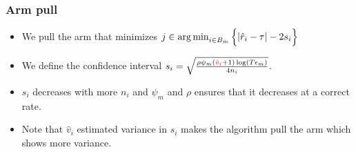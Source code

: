 \begin{frame}
\frametitle{Arm pull}
\begin{itemize}
\item<1-> We pull the arm that minimizes $j\in\operatorname*{arg\,min}_{i\in B_{m}}\Big\lbrace |\hat{r}_{i} - \tau | - 2s_{i}\Big\rbrace$
\item<2-> We define the confidence interval $s_i  = \sqrt{\frac{\rho\psi_m (\mathbin{\textcolor{red}{\hat{v}_{i}}}+1) \log ( T \epsilon_{m})}{4 n_{i}}}$.
\item<3-> $s_i$ decreases with more $n_i$ and $\psi_m$ and $\rho$ ensures that it decreases at a correct rate.
\item<4-> Note that $\hat{v}_i$ estimated variance in $s_i$ makes the algorithm pull the arm which shows more variance. 
\end{itemize}
\end{frame}

%
%


%
%

